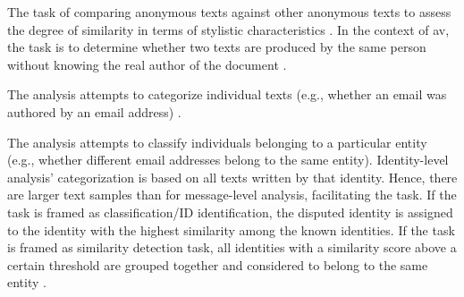 \begin{definition}
    The task of comparing anonymous texts against other anonymous texts to assess the degree of similarity in terms of stylistic characteristics \cite{abbasi_writeprints_2008,neal_surveying_2018}.
    In the context of \ac{av}, the task is to determine whether two texts are produced by the same person without knowing the real author of the document \cite{elmanarelbouanani_authorship_2014}.
\end{definition}

\begin{definition}
    The analysis attempts to categorize individual texts (e.g., whether an email was authored by an email address) \cite{abbasi_writeprints_2008}.
\end{definition}

\begin{definition}
    The analysis attempts to classify individuals belonging to a particular entity 
    (e.g., whether different email addresses belong to the same entity).
    Identity-level analysis' categorization is based on all texts written by that identity.
    Hence, there are larger text samples than for message-level analysis, facilitating the task.
    If the task is framed as classification/ID identification, the disputed identity is assigned to the identity with the highest similarity among the known identities.
    If the task is framed as similarity detection task, all identities with a similarity score above a certain threshold are grouped together and 
    considered to belong to the same entity \cite{abbasi_writeprints_2008}.
\end{definition}

